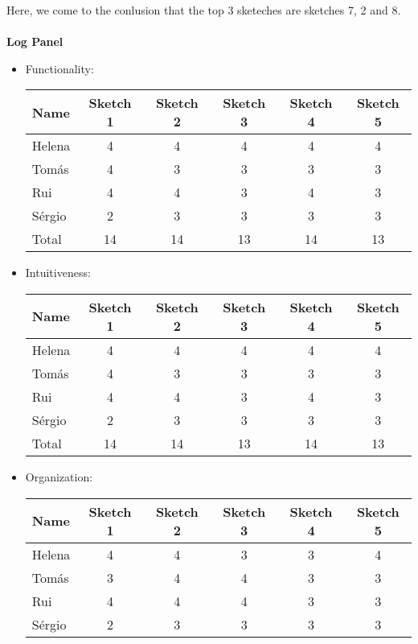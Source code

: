 Here, we come to the conlusion that the top 3 sketeches are
sketches 7, 2 and 8. \\\\
\textbf{Log Panel}
\begin{itemize}
    \item Functionality: 
\begin{table}[H]
\begin{tabular}{l*{5}{c}}
    Name & Sketch 1 & Sketch 2 & Sketch 3 & Sketch 4 & Sketch 5 \\
    \hline 
    Helena & 4 & 4 & 4 & 4 & 4 \\
    Tomás & 4 & 3 & 3 & 3 & 3 \\ 
    Rui & 4 & 4 & 3 & 4 & 3 \\ 
    Sérgio & 2 & 3 & 3 & 3 & 3 \\ 
    \hline
    Total & 14 & 14 & 13 & 14 & 13 \\
\end{tabular}
\end{table}
    \item Intuitiveness:
    \begin{table}[H]
        \begin{tabular}{l*{5}{c}}
            Name & Sketch 1 & Sketch 2 & Sketch 3 & Sketch 4 & Sketch 5 \\
            \hline 
            Helena & 4 & 4 & 4 & 4 & 4 \\
            Tomás & 4 & 3 & 3 & 3 & 3 \\ 
            Rui & 4 & 4 & 3 & 4 & 3 \\ 
            Sérgio & 2 & 3 & 3 & 3 & 3 \\ 
            \hline
            Total & 14 & 14 & 13 & 14 & 13 \\
        \end{tabular}
        \end{table}
\item Organization:
 \begin{table}[H]
    \begin{tabular}{l*{5}{c}}
        Name & Sketch 1 & Sketch 2 & Sketch 3 & Sketch 4 & Sketch 5 \\
        \hline 
        Helena & 4 & 4 & 3 & 3 & 4 \\
        Tomás & 3 & 4 & 4 & 3 & 3 \\ 
        Rui & 4 & 4 & 4 & 3 & 3 \\ 
        Sérgio & 2 & 3 & 3 & 3 & 3 \\ 

\end{tabular}
\end{table}
\end{itemize}
